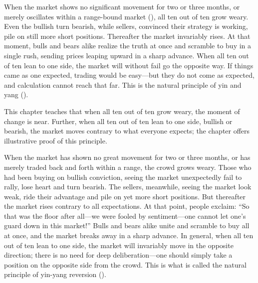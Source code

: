

\begin{sokyubox}
{\small\itshape\color{sokyubar} }

\medskip
When the market shows no significant movement for two or three
months, or merely oscillates within a range-bound market
(), all ten out of ten grow weary. Even the
bullish turn bearish, while sellers, convinced their strategy is
working, pile on still more short positions. Thereafter the market
invariably rises. At that moment, bulls and bears alike realize the
truth at once and scramble to buy in a single rush, sending prices
leaping upward in a sharp advance. When all ten out of ten lean to
one side, the market will without fail go the opposite way. If things
came as one expected, trading would be easy---but they do not come as
expected, and calculation cannot reach that far. This is the natural
principle of yin and yang ().
\end{sokyubox}

\commentary
This chapter teaches that when all ten out of ten grow weary, the
moment of change is near. Further, when all ten out of ten lean to one
side, bullish or bearish, the market moves contrary to what everyone
expects; the chapter offers illustrative proof of this principle.

When the market has shown no great movement for two or three months, or
has merely traded back and forth within a range, the crowd grows weary.
Those who had been buying on bullish conviction, seeing the market
unexpectedly fail to rally, lose heart and turn bearish. The sellers,
meanwhile, seeing the market look weak, ride their advantage and pile on
yet more short positions. But thereafter the market rises contrary to
all expectations. At that point, people exclaim: ``So that was the floor
after all---we were fooled by sentiment---one cannot let one's guard
down in this market!'' Bulls and bears alike unite and scramble to buy
all at once, and the market breaks away in a sharp advance. In general,
when all ten out of ten lean to one side, the market will invariably
move in the opposite direction; there is no need for deep
deliberation---one should simply take a position on the opposite side
from the crowd. This is what is called the natural principle of yin-yang
reversion ().

